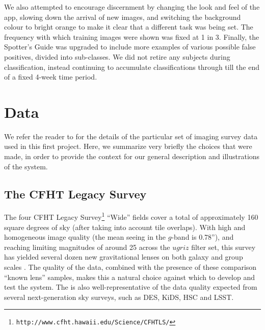 \documentclass[useAMS,usenatbib,a4paper]{mn2e}
\begin{document}
We also attempted to encourage discernment by changing the look and feel of the
app, slowing down the arrival of new images, and switching the background colour
to bright orange to make it clear that a different task was being set. The
frequency with which training images were shown was fixed at 1 in 3. Finally,
the Spotter's Guide was upgraded to include more examples of various possible
false positives, divided into sub-classes. We did not retire any subjects during
\StageTwo classification, instead continuing to accumulate classifications
through till the end of a fixed 4-week time period.



\section{Data}
\label{sec:data}

We refer the reader to \PaperTwo for the details of the particular set of
imaging survey data used in this first \SW project. Here, we summarize very
briefly the choices that were made, in order to provide the context for our
general description and illustrations of the \SW system.


\subsection{The CFHT Legacy Survey}
\label{sec:data:CFHTLS}

The four CFHT Legacy Survey\footnote{\texttt{http://www.cfht.hawaii.edu/Science/CFHTLS/}}
\citep[\cfhtls,][]{Gwyn2012} ``Wide'' fields cover a total of approximately
160 square degrees of sky (after taking into account tile overlaps).
With high and homogeneous image quality (the mean seeing in the $g$-band is
0.78''), and reaching limiting magnitudes of around 25 across the $ugriz$ filter
set, this survey has yielded several dozen new gravitational lenses on both
galaxy and group scales
\citep{GavazziEtal2014,SonnenfeldEtal13,CabanacEtal2007,MoreEtal2012}. The
quality of the data, combined with the presence of these comparison ``known
lens'' samples, makes this a natural choice against which to develop and test
the \SW system. The \cfhtls is also well-representative of the data quality
expected from several next-generation sky surveys, such as DES, KiDS, HSC and
LSST.
\end{document}
